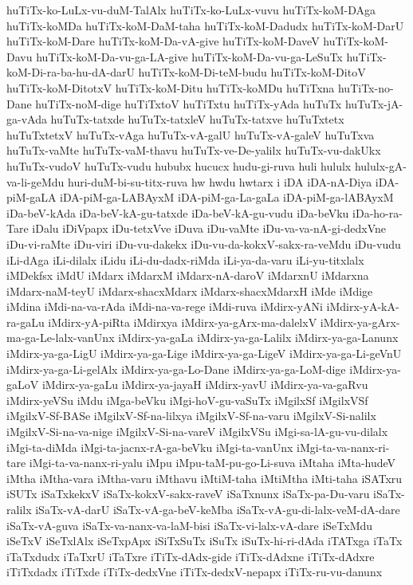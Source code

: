 {huTiTx-ko-LuLx-vu-duM-TalAlx
huTiTx-ko-LuLx-vuvu
huTiTx-koM-DAga
huTiTx-koMDa
huTiTx-koM-DaM-taha
huTiTx-koM-Dadudx
huTiTx-koM-DarU
huTiTx-koM-Dare
huTiTx-koM-Da-vA-give
huTiTx-koM-DaveV
huTiTx-koM-Davu
huTiTx-koM-Da-vu-ga-LA-give
huTiTx-koM-Da-vu-ga-LeSuTx
huTiTx-koM-Di-ra-ba-hu-dA-darU
huTiTx-koM-Di-teM-budu
huTiTx-koM-DitoV
huTiTx-koM-DitotxV
huTiTx-koM-Ditu
huTiTx-koMDu
huTiTxna
huTiTx-no-Dane
huTiTx-noM-dige
huTiTxtoV
huTiTxtu
huTiTx-yAda
huTuTx
huTuTx-jA-ga-vAda
huTuTx-tatxde
huTuTx-tatxleV
huTuTx-tatxve
huTuTxtetx
huTuTxtetxV
huTuTx-vAga
huTuTx-vA-galU
huTuTx-vA-galeV
huTuTxva
huTuTx-vaMte
huTuTx-vaM-thavu
huTuTx-ve-De-yalilx
huTuTx-vu-dakUkx
huTuTx-vudoV
huTuTx-vudu
hububx
hucucx
hudu-gi-ruva
huli
hululx
hululx-gA-va-li-geMdu
huri-duM-bi-su-titx-ruva
hw
hwdu
hwtarx
i
iDA
iDA-nA-Diya
iDA-piM-gaLA
iDA-piM-ga-LABAyxM
iDA-piM-ga-La-gaLa
iDA-piM-ga-lABAyxM
iDa-beV-kAda
iDa-beV-kA-gu-tatxde
iDa-beV-kA-gu-vudu
iDa-beVku
iDa-ho-ra-Tare
iDalu
iDiVpapx
iDu-tetxVve
iDuva
iDu-vaMte
iDu-va-va-nA-gi-dedxVne
iDu-vi-raMte
iDu-viri
iDu-vu-dakekx
iDu-vu-da-kokxV-sakx-ra-veMdu
iDu-vudu
iLi-dAga
iLi-dilalx
iLidu
iLi-du-dadx-riMda
iLi-ya-da-varu
iLi-yu-titxlalx
iMDekfsx
iMdU
iMdarx
iMdarxM
iMdarx-nA-daroV
iMdarxnU
iMdarxna
iMdarx-naM-teyU
iMdarx-shacxMdarx
iMdarx-shacxMdarxH
iMde
iMdige
iMdina
iMdi-na-va-rAda
iMdi-na-va-rege
iMdi-ruva
iMdirx-yANi
iMdirx-yA-kA-ra-gaLu
iMdirx-yA-piRta
iMdirxya
iMdirx-ya-gArx-ma-dalelxV
iMdirx-ya-gArx-ma-ga-Le-lalx-vanUnx
iMdirx-ya-gaLa
iMdirx-ya-ga-Lalilx
iMdirx-ya-ga-Lanunx
iMdirx-ya-ga-LigU
iMdirx-ya-ga-Lige
iMdirx-ya-ga-LigeV
iMdirx-ya-ga-Li-geVnU
iMdirx-ya-ga-Li-gelAlx
iMdirx-ya-ga-Lo-Dane
iMdirx-ya-ga-LoM-dige
iMdirx-ya-gaLoV
iMdirx-ya-gaLu
iMdirx-ya-jayaH
iMdirx-yavU
iMdirx-ya-va-gaRvu
iMdirx-yeVSu
iMdu
iMga-beVku
iMgi-hoV-gu-vaSuTx
iMgilxSf
iMgilxVSf
iMgilxV-Sf-BASe
iMgilxV-Sf-na-lilxya
iMgilxV-Sf-na-varu
iMgilxV-Si-nalilx
iMgilxV-Si-na-va-nige
iMgilxV-Si-na-vareV
iMgilxVSu
iMgi-sa-lA-gu-vu-dilalx
iMgi-ta-diMda
iMgi-ta-jacnx-rA-ga-beVku
iMgi-ta-vanUnx
iMgi-ta-va-nanx-ri-tare
iMgi-ta-va-nanx-ri-yalu
iMpu
iMpu-taM-pu-go-Li-suva
iMtaha
iMta-hudeV
iMtha
iMtha-vara
iMtha-varu
iMthavu
iMtiM-taha
iMtiMtha
iMti-taha
iSATxru
iSUTx
iSaTxkekxV
iSaTx-kokxV-sakx-raveV
iSaTxnunx
iSaTx-pa-Du-varu
iSaTx-ralilx
iSaTx-vA-darU
iSaTx-vA-ga-beV-keMba
iSaTx-vA-gu-di-lalx-veM-dA-dare
iSaTx-vA-guva
iSaTx-va-nanx-va-laM-bisi
iSaTx-vi-lalx-vA-dare
iSeTxMdu
iSeTxV
iSeTxlAlx
iSeTxpApx
iSiTxSuTx
iSuTx
iSuTx-hi-ri-dAda
iTATxga
iTaTx
iTaTxdudx
iTaTxrU
iTaTxre
iTiTx-dAdx-gide
iTiTx-dAdxne
iTiTx-dAdxre
iTiTxdadx
iTiTxde
iTiTx-dedxVne
iTiTx-dedxV-nepapx
iTiTx-ru-vu-danunx
}
